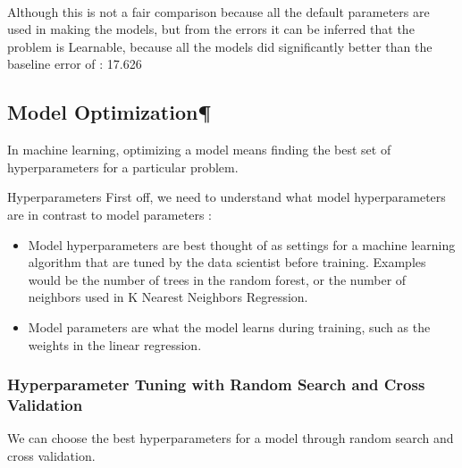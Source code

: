 \documentclass[11pt]{article}
\providecommand{\tightlist}{%
      \setlength{\itemsep}{0pt}\setlength{\parskip}{0pt}}
\begin{document}
    \begin{center}
    \end{center}
    { \hspace*{\fill} \\}
    
    Although this is not a fair comparison because all the default
parameters are used in making the models, but from the errors it can be
inferred that the problem is Learnable, because all the models did
significantly better than the baseline error of : 17.626

    \subsection{Model Optimization¶}\label{model-optimization}

In machine learning, optimizing a model means finding the best set of
hyperparameters for a particular problem.

Hyperparameters First off, we need to understand what model
hyperparameters are in contrast to model parameters :

\begin{itemize}
\tightlist
\item
  Model hyperparameters are best thought of as settings for a machine
  learning algorithm that are tuned by the data scientist before
  training. Examples would be the number of trees in the random forest,
  or the number of neighbors used in K Nearest Neighbors Regression.
\item
  Model parameters are what the model learns during training, such as
  the weights in the linear regression.
\end{itemize}

    \subsubsection{Hyperparameter Tuning with Random Search and Cross
Validation}\label{hyperparameter-tuning-with-random-search-and-cross-validation}

We can choose the best hyperparameters for a model through random search
and cross validation.
\end{document}
